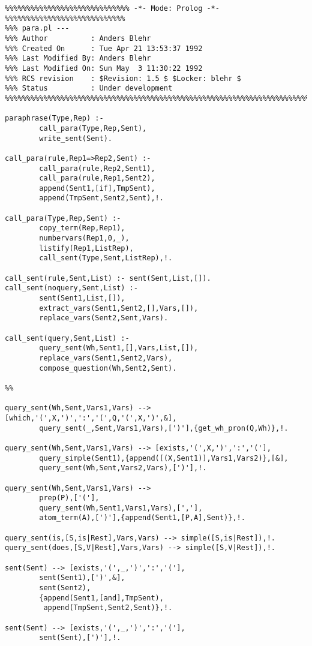 \begin{verbatim}
%%%%%%%%%%%%%%%%%%%%%%%%%%%%% -*- Mode: Prolog -*- %%%%%%%%%%%%%%%%%%%%%%%%%%%%
%%% para.pl --- 
%%% Author          : Anders Blehr
%%% Created On      : Tue Apr 21 13:53:37 1992
%%% Last Modified By: Anders Blehr
%%% Last Modified On: Sun May  3 11:30:22 1992
%%% RCS revision    : $Revision: 1.5 $ $Locker: blehr $
%%% Status          : Under development
%%%%%%%%%%%%%%%%%%%%%%%%%%%%%%%%%%%%%%%%%%%%%%%%%%%%%%%%%%%%%%%%%%%%%%%%%%%%%%

paraphrase(Type,Rep) :-
        call_para(Type,Rep,Sent),
        write_sent(Sent).

call_para(rule,Rep1=>Rep2,Sent) :-
        call_para(rule,Rep2,Sent1),
        call_para(rule,Rep1,Sent2),
        append(Sent1,[if],TmpSent),
        append(TmpSent,Sent2,Sent),!.

call_para(Type,Rep,Sent) :-
        copy_term(Rep,Rep1),
        numbervars(Rep1,0,_),
        listify(Rep1,ListRep),
        call_sent(Type,Sent,ListRep),!.

call_sent(rule,Sent,List) :- sent(Sent,List,[]).
call_sent(noquery,Sent,List) :- 
        sent(Sent1,List,[]),
        extract_vars(Sent1,Sent2,[],Vars,[]),
        replace_vars(Sent2,Sent,Vars).

call_sent(query,Sent,List) :- 
        query_sent(Wh,Sent1,[],Vars,List,[]),
        replace_vars(Sent1,Sent2,Vars),
        compose_question(Wh,Sent2,Sent).

%%

query_sent(Wh,Sent,Vars1,Vars) --> [which,'(',X,')',':','(',Q,'(',X,')',&],
        query_sent(_,Sent,Vars1,Vars),[')'],{get_wh_pron(Q,Wh)},!.

query_sent(Wh,Sent,Vars1,Vars) --> [exists,'(',X,')',':','('],
        query_simple(Sent1),{append([(X,Sent1)],Vars1,Vars2)},[&],
        query_sent(Wh,Sent,Vars2,Vars),[')'],!.

query_sent(Wh,Sent,Vars1,Vars) --> 
        prep(P),['('],
        query_sent(Wh,Sent1,Vars1,Vars),[','],
        atom_term(A),[')'],{append(Sent1,[P,A],Sent)},!.

query_sent(is,[S,is|Rest],Vars,Vars) --> simple([S,is|Rest]),!.
query_sent(does,[S,V|Rest],Vars,Vars) --> simple([S,V|Rest]),!.

sent(Sent) --> [exists,'(',_,')',':','('],
        sent(Sent1),[')',&],
        sent(Sent2),
        {append(Sent1,[and],TmpSent),
         append(TmpSent,Sent2,Sent)},!.

sent(Sent) --> [exists,'(',_,')',':','('],
        sent(Sent),[')'],!.


\end{verbatim}
